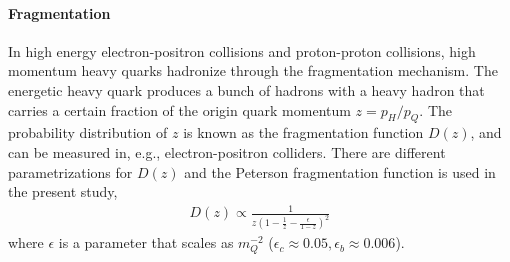 \paragraph{Fragmentation} 
In high energy electron-positron collisions and proton-proton collisions, high momentum heavy quarks hadronize through the fragmentation mechanism.
The energetic heavy quark produces a bunch of hadrons with a heavy hadron that carries a certain fraction of the origin quark momentum $z = p_H/p_Q$.
The probability distribution of $z$ is known as the fragmentation function $D(z)$, and can be measured in, e.g., electron-positron colliders.
There are different parametrizations for $D(z)$ and the Peterson fragmentation function \cite{PhysRevD.27.105} is used in the present study,
\begin{eqnarray}
D(z) \propto \frac{1}{z(1-\frac{1}{z} - \frac{\epsilon}{1-z})^2}
\end{eqnarray}
where $\epsilon$ is a parameter that scales as $m_Q^{-2}$ ($\epsilon_c \approx 0.05, \epsilon_b \approx 0.006$).

